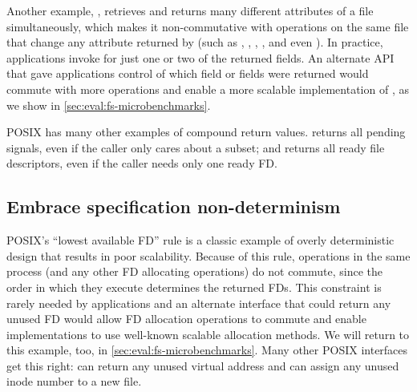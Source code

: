 Another example, , retrieves and returns many
different attributes of a file simultaneously, which makes it
non-commutative with operations on the same file that change any
attribute returned by  (such as , ,
, , and even ).  In practice,
applications invoke  for just one or two of the returned
fields. An alternate API that gave applications
control of which field or fields were returned
would commute with more operations and enable a more scalable
implementation of , as we show in
\cref{sec:eval:fs-microbenchmarks}.

POSIX has many other examples of compound return values.
 returns all pending signals, even if the caller only
cares about a subset;
and  returns all ready file
descriptors, even if the caller needs only one ready FD.



\subsection{Embrace specification non-determinism}

POSIX's ``lowest available FD'' rule is a classic example of
overly deterministic design that results in poor scalability.
Because of this rule,  operations in the same process (and
any other FD allocating operations) do not commute, since the order in
which they execute determines the returned FDs.  This constraint is rarely
needed by applications and an alternate interface
that could return any
unused FD would allow FD allocation operations to commute and enable
implementations to use well-known scalable allocation methods.  We will
return to this example, too, in \cref{sec:eval:fs-microbenchmarks}.
Many other POSIX interfaces get this right:  can
return any unused virtual address and  can assign any unused
inode number to a new file.


